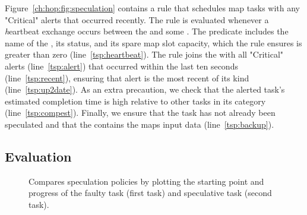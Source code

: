 Figure~\ref{ch:hop:fig:speculation} contains a rule that schedules map tasks with any "Critical" alerts
that occurred recently. The rule is evaluated whenever a {\emph heartbeat} exchange occurs between the \JT
and some \TT. The  predicate includes the name of the \TT, its status, and its spare map slot capacity, which
the rule ensures is greater than zero (line~\ref{tsp:heartbeat}). The rule joins the  with all "Critical" alerts (line~\ref{tsp:alert}) 
that occurred within the last ten seconds (line~\ref{tsp:recent}), ensuring that alert is the most recent of its kind (line~\ref{tsp:up2date}). 
As an extra precaution, we check that the alerted task's estimated completion time is high relative to other tasks in its category (line~\ref{tsp:compest}). 
Finally, we ensure that the task has not already been speculated and that the \TT contains the maps input data (line~\ref{tsp:backup}). 


\subsection{Evaluation}

\begin{figure}[ht]
\ssp
  \centering
  \caption{Compares speculation policies by plotting the starting point and progress of the faulty task (first task) and speculative task (second task).}
\label{fig:taskSpecPolicy}
\end{figure}

